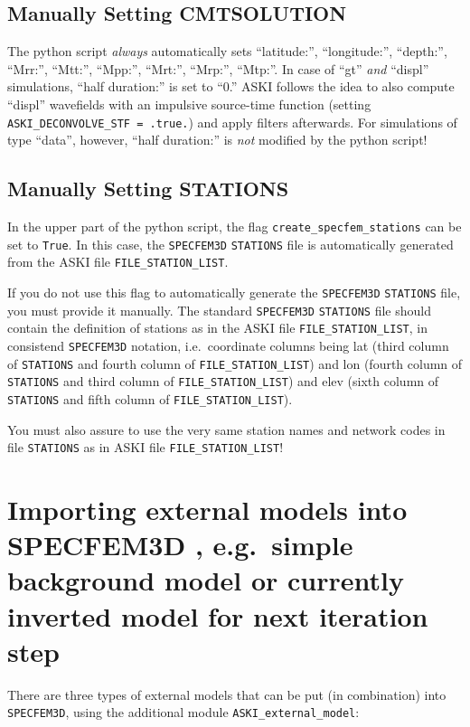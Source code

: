 \documentclass[12pt,a4paper]{article}
\newcommand{\lcode}[1]{\nolinkurl{#1}}
\newcommand{\lcodetitle}[1]{ {\ttfamily #1} }
\newcommand{\ASKI}{ {\ttfamily ASKI} }
\begin{document}
%
\subsection{Manually Setting \lcodetitle{CMTSOLUTION}}
%
The python script \emph{always} automatically sets ``latitude:'', ``longitude:'', ``depth:'', 
``Mrr:'', ``Mtt:'', ``Mpp:'', ``Mrt:'', ``Mrp:'', ``Mtp:''. In case of ``gt'' \emph{and} ``displ'' simulations,  
``half duration:'' is set to ``0.''
\ASKI follows the idea to also compute ``displ'' wavefields 
with an impulsive source-time function (setting \lcode{ASKI_DECONVOLVE_STF = .true.}) and apply filters
afterwards.
For simulations of type ``data'', however, ``half duration:'' is \emph{not} modified by the python script!
%
\subsection{Manually Setting \lcodetitle{STATIONS}}
%
In the upper part of the python script, the flag \lcode{create_specfem_stations} can be set to \lcode{True}.
In this case, the \lcode{SPECFEM3D} \lcode{STATIONS} file is automatically generated from the 
\ASKI file \lcode{FILE_STATION_LIST}.

If you do not use this flag to automatically generate the \lcode{SPECFEM3D} \lcode{STATIONS} file,
you must provide it manually.
The standard \lcode{SPECFEM3D} \lcode{STATIONS} file should contain the definition of stations as
in the \ASKI file \lcode{FILE_STATION_LIST}, in consistend \lcode{SPECFEM3D} notation, i.e.\ coordinate
columns being lat (third column of \lcode{STATIONS} and fourth column of \lcode{FILE_STATION_LIST}) and 
lon (fourth column of \lcode{STATIONS} and third column of \lcode{FILE_STATION_LIST}) and 
elev (sixth column of \lcode{STATIONS} and fifth column of \lcode{FILE_STATION_LIST}). 

You must also assure to use the very same station names and network codes in file \lcode{STATIONS} as in 
\ASKI file \lcode{FILE_STATION_LIST}!
%
\section{Importing external models into \lcodetitle{SPECFEM3D}, e.g.\ simple background model or currently inverted model for next iteration step} \label{import_model}
%
There are three types of external models that can be put (in combination) into \lcode{SPECFEM3D}, 
using the additional module \lcode{ASKI_external_model}:
\end{document}
